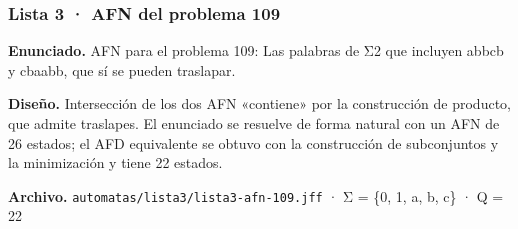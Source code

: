 
\hypertarget{lista-3-afn-del-problema-109}{%
\subsubsection{Lista 3 · AFN del problema 109}\label{lista-3-afn-del-problema-109}}

\textbf{Enunciado.} AFN para el problema 109: Las palabras de Σ2 que incluyen abbcb y cbaabb, que sí se pueden traslapar.

\textbf{Diseño.} Intersección de los dos AFN «contiene» por la construcción de producto, que admite traslapes. El enunciado se resuelve de forma natural con un AFN de 26 estados; el AFD equivalente se obtuvo con la construcción de subconjuntos y la minimización y tiene 22 estados.

\textbf{Archivo.} \texttt{automatas/lista3/lista3-afn-109.jff} · Σ = \{0, 1, a, b, c\} · \textbar Q\textbar{} = 22


